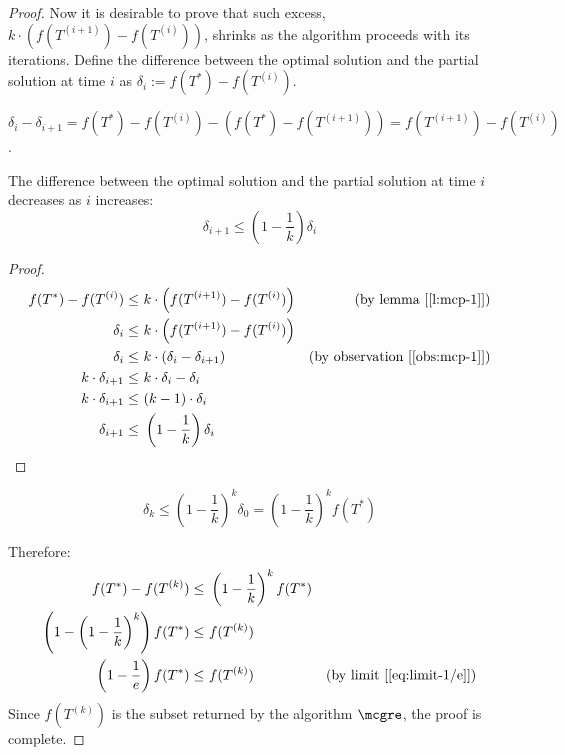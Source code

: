 \begin{proof}
    Now it is desirable to prove that such excess, $k \cdot \left( f(T^{(i + 1)}) - f(T^{(i)}) \right)$, shrinks as the algorithm proceeds with its iterations. Define the difference between the optimal solution and the partial solution at time $i$ as $\delta_i := f(T^*) - f(T^{(i)})$.
    
    \begin{observation}\label{obs:mcp-1}
        $\delta_i - \delta_{i+1} = f(T^*) - f(T^{(i)}) - \left( f(T^*) - f(T^{(i + 1)}) \right) = f(T^{(i + 1)}) - f(T^{(i)})$.
    \end{observation}
    
    \begin{lemma}\label{l:mcp-2}
        The difference between the optimal solution and the partial solution at time $i$ decreases as $i$ increases:
        \[
            \delta_{i + 1} \leq \left( 1 - \frac{1}{k} \right) \delta_i
        \]
    \end{lemma}
    \begin{proof}
        \begin{align*}
            f(T^*) - f(T^{(i)})     \leq&\ k \cdot \left( f(T^{(i + 1)}) - f(T^{(i)}) \right)   & \text{(by lemma [\ref{l:mcp-1}])} \\
            \delta_i                \leq&\ k \cdot \left( f(T^{(i + 1)}) - f(T^{(i)}) \right)   & \\
            \delta_i                \leq&\ k \cdot \left( \delta_i - \delta_{i + 1} \right)     & \text{(by observation [\ref{obs:mcp-1}])} \\
            k \cdot \delta_{i + 1}  \leq&\ k \cdot \delta_i - \delta_i                          & \\
            k \cdot \delta_{i + 1}  \leq&\ (k - 1) \cdot \delta_i                               & \\
            \delta_{i + 1}          \leq&\ \left( 1 - \frac{1}{k} \right) \delta_i              & 
        \end{align*}
    \end{proof}

    \begin{corollary}
        \[
            \delta_k \leq \left( 1 - \frac{1}{k} \right)^k \delta_0 = \left( 1 - \frac{1}{k} \right)^k f(T^*)
        \]
    \end{corollary}

    Therefore:
    \begin{align*}
        f(T^*) - f(T^{(k)}) \leq&\ \left( 1 - \frac{1}{k} \right)^k f(T^*)              & \\
        \left( 1 - \left( 1 - \frac{1}{k} \right)^k \right) f(T^*) \leq&\ f(T^{(k)})    & \\
        \left( 1 - \frac{1}{e} \right) f(T^*) \leq&\ f(T^{(k)})                         & \text{(by limit [\ref{eq:limit-1/e}])} \\
    \end{align*}
    Since $f(T^{(k)})$ is the subset returned by the algorithm $\mcgre$, the proof is complete.
\end{proof}


